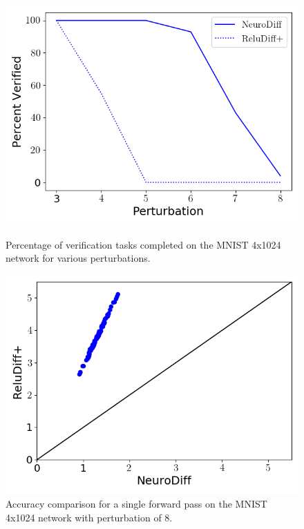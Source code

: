 \begin{figure}[t]
\centering
	\begin{minipage}[t]{0.498\linewidth}
        \centering
		\captionsetup{width=0.9\textwidth}
		\includegraphics[width=.99\linewidth]{neurodiff/figs/4x1024_comp.png}
		\caption{Percentage of verification tasks completed on the MNIST 4x1024
		network for various perturbations.\label{neurodiff:fig:perturbation_comp}}
	\end{minipage}%
	\begin{minipage}[t]{0.498\linewidth}
        \centering
		\captionsetup{width=0.9\textwidth}
		\includegraphics[width=.99\linewidth]{neurodiff/figs/mnist_4x1024_scatterplot.png}
		\caption{Accuracy comparison for a single forward pass on the MNIST 4x1024
		network with perturbation of 8.\label{neurodiff:fig:accuracy_comp}}
	\end{minipage}%
\end{figure}

